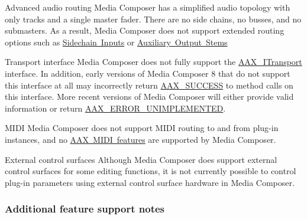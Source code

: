 \begin{DoxyItemize}
\item Advanced audio routing  Media Composer has a simplified audio topology with only tracks and a single master fader. There are no side chains, no busses, and no submasters. As a result, Media Composer does not support extended routing options such as \mbox{\hyperlink{a00808}{Sidechain Inputs}} or \mbox{\hyperlink{a00809}{Auxiliary Output Stems}}  
\item Transport interface  Media Composer does not fully support the \mbox{\hyperlink{a01885}{A\+A\+X\+\_\+\+I\+Transport}} interface. In addition, early versions of Media Composer 8 that do not support this interface at all may incorrectly return \mbox{\hyperlink{a00494_a5f8c7439f3a706c4f8315a9609811937aeddbd1bb67e3a66e6af54a4b4a7a57b3}{A\+A\+X\+\_\+\+S\+U\+C\+C\+E\+SS}} to method calls on this interface. More recent versions of Media Composer will either provide valid information or return \mbox{\hyperlink{a00494_a5f8c7439f3a706c4f8315a9609811937a3b76994b32b97fcd56b19ef8032245df}{A\+A\+X\+\_\+\+E\+R\+R\+O\+R\+\_\+\+U\+N\+I\+M\+P\+L\+E\+M\+E\+N\+T\+ED}}.  
\item M\+I\+DI  Media Composer does not support M\+I\+DI routing to and from plug-\/in instances, and no \mbox{\hyperlink{a00806}{A\+AX M\+I\+DI features}} are supported by Media Composer.  
\item External control surfaces  Although Media Composer does support external control surfaces for some editing functions, it is not currently possible to control plug-\/in parameters using external control surface hardware in Media Composer.  
\end{DoxyItemize}

\hypertarget{a00831_subsection__aax_media_composer_guide__features__additional_notes}{}\subsubsection{Additional feature support notes}\label{a00831_subsection__aax_media_composer_guide__features__additional_notes}
 
